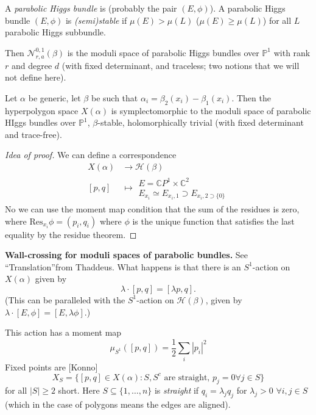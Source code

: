 A {\it parabolic Higgs bundle} is (probably
the pair $(E,\phi)$).
A parabolic Higgs bundle $(E,\phi)$ is {\it
(semi)stable}
if  $\mu(E) > \mu(L)$ ($\mu(E) \geq \mu(L)$)
for all
$L$ parabolic Higgs subbundle.

Then $\mathcal{N}_{r,a}^{0,1}(\beta)$ is the
moduli
space of parabolic Higgs bundles over
$\mathbb{P}^1$
with rank $r$ and degree $d$ (with fixed
determinant,
and traceless; two notions that we will not
define here).


\begin{theorem}
\label{theorem-GBSFG}
Let $\alpha$ be generic, let $\beta$
be such that
$\alpha_i=\beta_2(x_i)-\beta_1(x_i)$.
Then the hyperpolygon space $X(\alpha)$
is symplectomorphic to the moduli space
of parabolic HIggs bundles over
$\mathbb{P}^1$, $\beta$-stable,
holomorphically trivial (with fixed
determinant and trace-free).


\begin{proof}[Idea of proof]
We can define a correspondence
$$
\begin{aligned}
X(\alpha) &\longrightarrow \mathcal{H}(\beta)
\\
[p,q] &\longmapsto
\substack{E=\mathbb{C}P^{1}\times
\mathbb{C}^2
 \\ E_{x_i}\simeq E_{x_i,1}\supset
 E_{x_i,2\supset \{0\}}}
\end{aligned}
$$
No we can use the moment map condition
that the sum of the residues is zero,
where $\text{Res}_{x_i}\phi=(p_i,q_i)$
where $\phi$ is the unique function
that satisfies the last equality by
the residue theorem.
\end{proof}
\end{theorem}

\medskip\noindent
{\bf Wall-crossing for moduli spaces of
parabolic bundles.}
See ``Translation''from Thaddeus.
What happens is that there is an $S^1$-action
on $X(\alpha)$ given by
$$
\lambda\cdot[p,q]=[\lambda p,q].
$$
(This can be paralleled with the $S^1$-action
on $\mathcal{H}(\beta)$,
given by
$\lambda\cdot[E,\phi]=[E,\lambda\phi]$.)

This action has a moment map
$$
\mu_{S^1}([p,q])=\frac{1}{2}\sum_{i}|p_i|^2
$$
Fixed points are [Konno]
$$
X_S=\{[p,q] \in X(\alpha):
S,S^c \text{ are straight, }p_j=0 \forall j
\in S\}
$$
for all $|S|\geq 2$ short. Here $S\subseteq
\{1,\ldots,n\}$
is {\it straight} if $q_i=\lambda_j q_j$
for $\lambda_j>0$ $\forall  i,j \in S$
(which in the case of polygons means the
edges are aligned).

